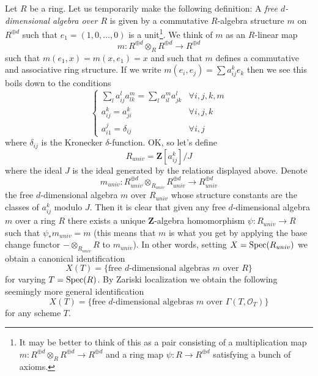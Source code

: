 \medskip\noindent
Let $R$ be a ring. Let us temporarily make the following definition:
A {\it free $d$-dimensional algebra over $R$}
is given by a commutative $R$-algebra structure $m$ on $R^{\oplus d}$
such that $e_1 = (1, 0, \ldots, 0)$ is a unit\footnote{It may be better
to think of this as a pair consisting of a multiplication map
$m : R^{\oplus d} \otimes_R R^{\oplus d} \to R^{\oplus d}$ and
a ring map $\psi : R \to R^{\oplus d}$ satisfying a bunch of axioms.}.
We think of $m$ as an $R$-linear map
$$
m : R^{\oplus d} \otimes_R R^{\oplus d} \longrightarrow R^{\oplus d}
$$
such that $m(e_1, x) = m(x, e_1) = x$ and such that $m$ defines a
commutative and associative ring structure. If we write
$m(e_i, e_j) = \sum a_{ij}^ke_k$ then we see this boils down
to the conditions
$$
\left\{
\begin{matrix}
\sum_l a_{ij}^la_{lk}^m = \sum_l a_{il}^ma_{jk}^l & \forall i, j, k, m \\
a_{ij}^k = a_{ji}^k & \forall i, j, k \\
a_{i1}^j = \delta_{ij} & \forall i, j
\end{matrix}
\right.
$$
where $\delta_{ij}$ is the Kronecker $\delta$-function. OK, so let's define
$$
R_{univ} = \mathbf{Z}[a_{ij}^k]/J
$$
where the ideal $J$ is the ideal generated by the relations displayed above.
Denote
$$
m_{univ} :
R_{univ}^{\oplus d} \otimes_{R_{univ}} R_{univ}^{\oplus d}
\longrightarrow
R_{univ}^{\oplus d}
$$
the free $d$-dimensional algebra $m$ over $R_{univ}$ whose structure
constants are the classes of $a_{ij}^k$ modulo $J$.
Then it is clear that given any free $d$-dimensional algebra $m$ over a ring
$R$ there exists a unique $\mathbf{Z}$-algebra homomorphism
$\psi : R_{univ} \to R$ such that $\psi_*m_{univ} = m$ (this means that
$m$ is what you get by applying the base change functor
$- \otimes_{R_{univ}} R$ to $m_{univ}$). In other words, setting
$X = \mathop{\mathrm{Spec}}(R_{univ})$ we obtain a canonical identification
$$
X(T) = \{\text{free }d\text{-dimensional algebras }m\text{ over }R\}
$$
for varying $T = \mathop{\mathrm{Spec}}(R)$. By Zariski localization we obtain
the following seemingly more general identification
\begin{equation}
\label{equation-objects}
X(T) = \{\text{free }d\text{-dimensional algebras }
m\text{ over }\Gamma(T, \mathcal{O}_T)\}
\end{equation}
for any scheme $T$.

